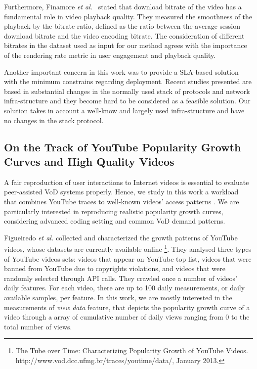 Furthermore,  Finamore \emph{et al.}~\cite{Finamore_imc_2011} stated
that download  bitrate of the video has a fundamental role in video
playback quality.  They measured the smoothness of the playback by the
bitrate ratio,  defined as the ratio between the average session
download bitrate and  the video encoding bitrate. The consideration of
different bitrates  in the dataset used as input for our method agrees
with the importance  of the rendering rate metric in user engagement 
and playback quality.

Another important concern in this work was to provide a SLA-based solution with
the minimum constrains regarding deployment. Recent studies\cite{d3_sigcomm2011, dctcp_sigcomm_2010} presented
are based in substantial changes in the normally used stack of
protocols and network infra-structure and they become hard to be
considered as a feasible solution. Our solution takes in account a
well-know and largely used infra-structure and have no changes in the
stack protocol.

\subsection{On the Track of YouTube Popularity Growth Curves and High Quality Videos}
\label{subsec:motivation_youtube_traces}

A fair reproduction of user interactions to Internet videos is essential to evaluate peer-assisted VoD systems properly. Hence, we study in this work a workload that combines YouTube traces\cite{youtube_wsdm_2011} to well-known videos{'} access patterns \cite{popularity_prediction_2010}. We are particularly interested in reproducing realistic popularity growth curves, considering advanced coding setting and common VoD demand patterns.

Figueiredo \emph{et al.} \cite{youtube_wsdm_2011} collected and characterized the growth patterns of YouTube videos, whose datasets are currently available online \footnote{The Tube over Time: Characterizing Popularity Growth of YouTube Videos. http://www.vod.dcc.ufmg.br/traces/youtime/data/, January 2013.}. They analysed three types of YouTube videos sets: videos that appear on YouTube top list, videos that were banned from YouTube due to copyrights violations, and videos that were randomly selected through API calls. They crawled once a number of videos' daily features. For each video, there are up to 100 daily measurements, or daily available samples, per feature. In this work, we are mostly interested in the measurements of \emph{view data} feature, that depicts the popularity growth curve of a video through a array of cumulative number of daily views ranging from 0 to the total number of views.

